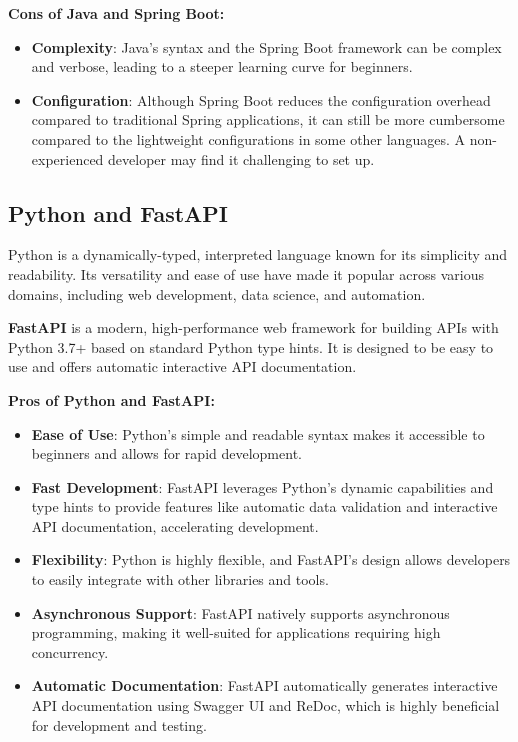 \textbf{Cons of Java and Spring Boot:}
\begin{itemize}
    \item \textbf{Complexity}: Java's syntax and the Spring Boot framework can be complex and verbose, leading to a steeper learning curve for beginners.
    \item \textbf{Configuration}: Although Spring Boot reduces the configuration overhead compared to traditional Spring applications, it can still be more cumbersome compared to the lightweight configurations in some other languages. A non-experienced developer may find it challenging to set up.
\end{itemize}

\subsection{Python and FastAPI}

Python is a dynamically-typed, interpreted language known for its simplicity and readability. Its versatility and ease of use have made it popular across various domains, including web development, data science, and automation.

\textbf{FastAPI} is a modern, high-performance web framework for building APIs with Python 3.7+ based on standard Python type hints. It is designed to be easy to use and offers automatic interactive API documentation.

\textbf{Pros of Python and FastAPI:}
\begin{itemize}
    \item \textbf{Ease of Use}: Python's simple and readable syntax makes it accessible to beginners and allows for rapid development.
    \item \textbf{Fast Development}: FastAPI leverages Python's dynamic capabilities and type hints to provide features like automatic data validation and interactive API documentation, accelerating development.
    \item \textbf{Flexibility}: Python is highly flexible, and FastAPI's design allows developers to easily integrate with other libraries and tools.
    \item \textbf{Asynchronous Support}: FastAPI natively supports asynchronous programming, making it well-suited for applications requiring high concurrency.
    \item \textbf{Automatic Documentation}: FastAPI automatically generates interactive API documentation using Swagger UI and ReDoc, which is highly beneficial for development and testing.
\end{itemize}

